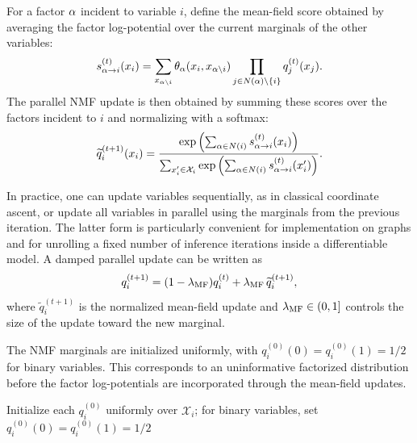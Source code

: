 For a factor $\alpha$ incident to variable $i$, define the mean-field score obtained by averaging the factor log-potential over the current marginals of the other variables:
\begin{equation}
    \label{equ:nmf_factor_score}
    s_{\alpha\rightarrow i}^{(t)}(x_i) = \sum_{x_{\alpha\setminus i}} \theta_{\alpha}(x_i,x_{\alpha\setminus i}) \prod_{j\in N(\alpha)\setminus\{i\}} q_j^{(t)}(x_j).
\end{equation}
The parallel NMF update is then obtained by summing these scores over the factors incident to $i$ and normalizing with a softmax:
\begin{equation}
    \label{equ:nmf_softmax_update}
    \widetilde{q}_i^{(t+1)}(x_i) = \frac{
        \exp\left(
            \sum_{\alpha\in N(i)} s_{\alpha\rightarrow i}^{(t)}(x_i)
        \right)
    }{
        \sum_{x'_i\in\mathcal{X}_i}
        \exp\left(
            \sum_{\alpha\in N(i)} s_{\alpha\rightarrow i}^{(t)}(x'_i)
        \right)
    }.
\end{equation}

In practice, one can update variables sequentially, as in classical coordinate ascent, or update all variables in parallel using the marginals from the previous iteration. The latter form is particularly convenient for implementation on graphs and for unrolling a fixed number of inference iterations inside a differentiable model. A damped parallel update can be written as
\begin{equation}
    \label{equ:nmf_damped_update}
    q_i^{(t+1)} = (1-\lambda_{\mathrm{MF}})q_i^{(t)} + \lambda_{\mathrm{MF}} \,\widetilde{q}_i^{(t+1)},
\end{equation}
where $\widetilde{q}_i^{(t+1)}$ is the normalized mean-field update and $\lambda_{\mathrm{MF}}\in(0,1]$ controls the size of the update toward the new marginal.

The NMF marginals are initialized uniformly, with $q_i^{(0)}(0)=q_i^{(0)}(1)=1/2$ for binary variables. This corresponds to an uninformative factorized distribution before the factor log-potentials are incorporated through the mean-field updates.

\begin{algorithm}[htbp]
\caption{Naive Mean-Field Inference}
\label{alg:naive_mean_field}
Initialize each $q_i^{(0)}$ uniformly over $\mathcal{X}_i$; for binary variables, set $q_i^{(0)}(0)=q_i^{(0)}(1)=1/2$\;
\end{algorithm}

